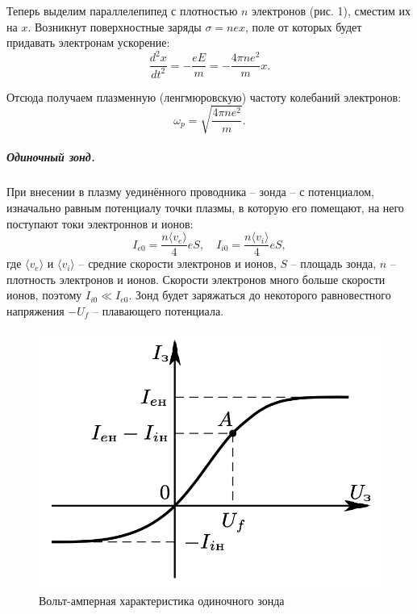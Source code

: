 \documentclass[12pt,a4paper]{article}
\begin{document}
Теперь выделим параллелепипед с плотностью $n$ электронов (рис. 1), сместим их на $x$. 
Возникнут поверхностные заряды $\sigma = nex$, поле от которых будет придавать электронам ускорение:
\[\dfrac{d^2x}{dt^2}=-\dfrac{eE}{m}=-\dfrac{4\pi n e^2}{m}x.\]

Отсюда получаем плазменную (ленгмюровскую) частоту колебаний электронов:
\begin{equation}
    \omega_p = \sqrt{\dfrac{4\pi ne^2}{m}}.
\end{equation}

\subparagraph*{Одиночный зонд.}
При внесении в плазму уединённого проводника -- зонда -- с потенциалом, изначально равным потенциалу точки плазмы, в которую его помещают, на него поступают токи электроннов и ионов:
\begin{equation}
        I_{e0} = \dfrac{n \langle v_e \rangle}{4}eS,\quad I_{i0} = \dfrac{n \langle v_i \rangle}{4}eS,
\end{equation}
где $\langle v_e \rangle$ и $\langle v_i \rangle$ -- средние скорости электронов и ионов, $S$ -- площадь зонда, $n$ -- плотность электронов и ионов. 
Скорости электронов много больше скорости ионов, поэтому $I_{i0} \ll I_{e0}$. 
Зонд будет заряжаться до некоторого равновестного напряжения $-U_f$ -- плавающего потенциала.\\

\begin{figure}
    \includegraphics[width=\linewidth]{2.png}
    \caption{\small{Вольт-амперная характеристика одиночного зонда}}
\end{figure}  
\end{document}
